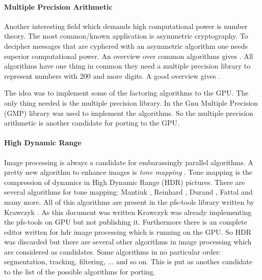\paragraph{Multiple Precision Arithmetic} %
\label{par:multiple_precision_arithmetic}
Another interesting field which demands high computational power is number
theory. The most common/known application is asymmetric cryptography. To
decipher messages that are cyphered with an asymmetric algorithm one needs
superior computational power. An overview over common algorithms gives
\cite{citeulike:3783254}. All algorithms have one thing in common they need a
multiple precision library to represent numbers with 200 and more digits. A good
overview gives \cite{citeulike:3783244}.

The idea was to implement some of the factoring algorithms to the GPU. The only
thing needed is the multiple precision library. In \cite{citeulike:3783254} the
Gnu Multiple Precision (GMP) library was used to implement the algorithms. So
the multiple precision arithmetic is another candidate for porting to the GPU.

\paragraph{High Dynamic Range} %
\label{par:high_dynamic_range}
Image processing is always a candidate for embarassingly parallel algorithms. A
pretty new algorithm to enhance images is \emph{tone mapping}
\cite{citeulike:3783303}. Tone mapping is the compression of dynamics in High
Dynamic Range (HDR) pictures. There are several algorithms for tone mapping:
Mantiuk \cite{citeulike:3783315}, Reinhard \cite{citeulike:3783311}, Durand
\cite{citeulike:789299}, Fattal \cite{citeulike:3783313} and many more. All of
this algorithms are present in the pfs-tools library written by Krawczyk
\cite{citeulike:3783303}. As this document was written Krawczyk was already
implementing the pfs-tools on \gls{GPU} but not publishing it. Furthermore there is an
complete editor written for hdr image processing which is running on the GPU. So
HDR was discarded but there are several other algorithms in image processing
which are considered as candidates. Some algorithms in no particular order:
segmentation, tracking, filtering, ... and so on. This is put as another
candidate to the list of the possible algorithms for porting. 

